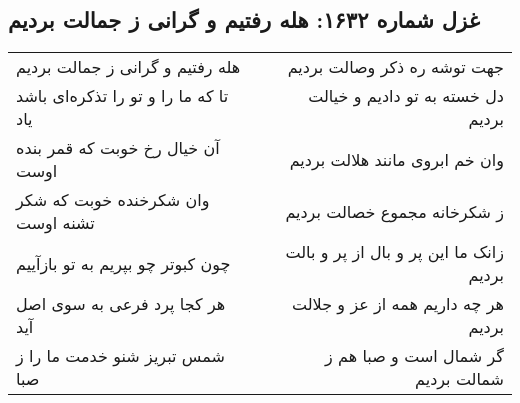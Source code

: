\begin{center}
\section*{غزل شماره ۱۶۳۲: هله رفتیم و گرانی ز جمالت بردیم}
\label{sec:1632}
\begin{longtable}{l p{0.5cm} r}
هله رفتیم و گرانی ز جمالت بردیم
&&
جهت توشه ره ذکر وصالت بردیم
\\
تا که ما را و تو را تذکره‌ای باشد یاد
&&
دل خسته به تو دادیم و خیالت بردیم
\\
آن خیال رخ خوبت که قمر بنده اوست
&&
وان خم ابروی مانند هلالت بردیم
\\
وان شکرخنده خوبت که شکر تشنه اوست
&&
ز شکرخانه مجموع خصالت بردیم
\\
چون کبوتر چو بپریم به تو بازآییم
&&
زانک ما این پر و بال از پر و بالت بردیم
\\
هر کجا پرد فرعی به سوی اصل آید
&&
هر چه داریم همه از عز و جلالت بردیم
\\
شمس تبریز شنو خدمت ما را ز صبا
&&
گر شمال است و صبا هم ز شمالت بردیم
\\
\end{longtable}
\end{center}
